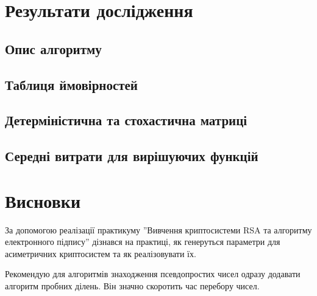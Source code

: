 \section{Результати дослідження}

\subsection{Опис алгоритму}

\subsection{Таблиця ймовірностей}

\subsection{Детерміністична та стохастична матриці}

\subsection{Середні витрати для вирішуючих функцій}

\section{Висновки}
За допомогою реалізації практикуму ''Вивчення криптосистеми RSA та алгоритму електронного
підпису'' дізнався на практиці, як генеруться параметри для асиметричних криптосистем та як реалізовувати їх. 

Рекомендую для алгоритмів знаходження псевдопростих чисел одразу додавати алгоритм пробних ділень. Він значно скоротить час перебору чисел.

		

	





